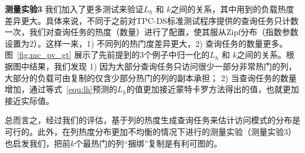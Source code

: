 \par \noindent\textbf{测量实验3} \quad 我们加入了更多测试来验证$L_h$ 和 $k$之间的关系，其中用到的负载热度差异更大。具体来说，不同于之前对TPC-DS标准测试程序提供的查询任务只计数一次，我们对查询任务的热度（数量）进行了配置，使其服从Zipf分布（指数参数设置为2）。这样一来，1) 不同列的热门度差异更大，2) 查询任务的数量更多。图~\ref{fig:mc_pv_gt} 展示了先前提到的3个例子中归一化的$L_h$ 和 $k$之间的关系。根据图中结果，我们发现 1) 因为大部分查询任务只访问很少一部分非常热门的列，大部分的负载可由复制的仅含少部分热门的列的副本承担； 2) 当查询任务的数量增加，通过等式~\ref{equ:lh}预测的$L_h$的值更加接近蒙特卡罗方法得出的值，也就更加接近实际值。


\par 总而言之，经过我们的评估，基于列的热度生成查询任务来估计访问模式的分布是可行的。此外，在列热度分布更加不均衡的情况下进行的测量实验（测量实验3）也启发我们，把前$k$个最热门的列“捆绑”复制是有利可图的。

